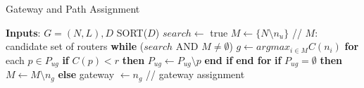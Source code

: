 \begin{algorithm}[htbp]
  \caption{Gateway and Path Assignment}
  \label{alg:assignment}
  \begin{algorithmic}
  \small
    \STATE \textbf{Inputs}: $G = (N, L), D$
    \vspace{2mm}
    \STATE  SORT($D$)
    \vspace{0.7mm}
    \vspace{0.7mm}
    \STATE \hspace{0.4cm} $search \leftarrow$ true
    \vspace{0.7mm}
    \STATE \hspace{0.4cm} $M \leftarrow \{N \setminus {n_u}\}$ \hspace{0.3cm} // $M:$ candidate set of routers
    \vspace{0.7mm}
    \STATE \hspace{0.4cm} \textbf{while} ($search$ AND $M \neq \emptyset$)
    \vspace{0.7mm}
    \STATE \hspace{0.8cm} $g \leftarrow argmax_{i \in M} C(n_i)$
    \vspace{0.7mm} 
    \STATE \hspace{0.8cm} \textbf{for} each $p \in P_{ug}$
    \vspace{0.7mm}
    \STATE \hspace{1.2cm} \textbf{if} $C(p) < r$ \textbf{then}
    \vspace{0.7mm}
    \STATE \hspace{1.6cm} $P_{ug} \leftarrow P_{ug} \setminus {p}$
    \vspace{0.7mm}
    \STATE \hspace{1.2cm} \textbf{end if}
    \vspace{0.7mm}
    \STATE \hspace{0.8cm} \textbf{end for}
    \vspace{0.7mm}
    \STATE \hspace{0.8cm} \textbf{if} $P_{ug} = \emptyset$ \textbf{then}
    \vspace{0.7mm}
    \STATE \hspace{1.2cm} $M \leftarrow M \setminus {n_g}$
    \vspace{0.7mm}
    \STATE \hspace{0.8cm} \textbf{else}
    \vspace{0.7mm}
    \STATE \hspace{1.2cm} gateway $\leftarrow n_g$ \hspace{0.6cm} // gateway assignment

\end{algorithmic}
\end{algorithm}
